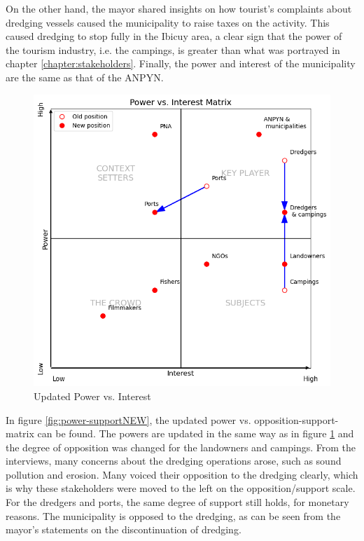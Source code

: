 On the other hand, the mayor shared insights on how tourist's complaints about dredging vessels caused the municipality to raise taxes on the activity. This caused dredging to stop fully in the Ibicuy area, a clear sign that the power of the tourism industry, i.e. the campings, is greater than what was portrayed in chapter \ref{chapter:stakeholders}. Finally, the power and interest of the municipality are the same as that of the ANPYN.

\begin{figure}[H]
    \centering
    \includegraphics[width=0.70\linewidth]{figures/ch3/NewPowerVSInterest.png}
    \caption{Updated Power vs. Interest}
    \label{fig:power-interestNEW}
\end{figure}

In figure \ref{fig:power-supportNEW}, the updated power vs. opposition-support-matrix can be found. The powers are updated in the same way as in figure \ref{fig:power-interestNEW} and the degree of opposition was changed for the landowners and campings. From the interviews, many concerns about the dredging operations arose, such as sound pollution and erosion. Many voiced their opposition to the dredging clearly, which is why these stakeholders were moved to the left on the opposition/support scale. For the dredgers and ports, the same degree of support still holds, for monetary reasons. The municipality is opposed to the dredging, as can be seen from the mayor's statements on the discontinuation of dredging.

